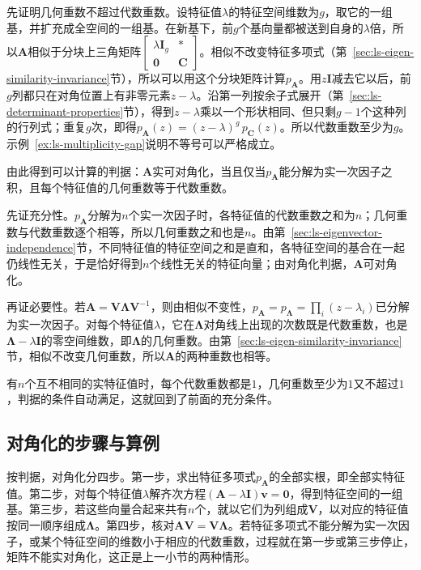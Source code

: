 先证明几何重数不超过代数重数。设特征值$\lambda$的特征空间维数为$g$，取它的一组基，并扩充成全空间的一组基。在新基下，前$g$个基向量都被送到自身的$\lambda$倍，所以$\bm A$相似于分块上三角矩阵$\left[\begin{smallmatrix}\lambda\bm I_g&*\\\bm0&\bm C\end{smallmatrix}\right]$。相似不改变特征多项式（第~\ref{sec:ls-eigen-similarity-invariance}节），所以可以用这个分块矩阵计算$p_{\bm A}$。用$z\bm I$减去它以后，前$g$列都只在对角位置上有非零元素$z-\lambda$。沿第一列按余子式展开（第~\ref{sec:ls-determinant-properties}节），得到$z-\lambda$乘以一个形状相同、但只剩$g-1$个这种列的行列式；重复$g$次，即得$p_{\bm A}(z)=(z-\lambda)^g\,p_{\bm C}(z)$。所以代数重数至少为$g$。示例~\ref{ex:ls-multiplicity-gap}说明不等号可以严格成立。

由此得到可以计算的判据：$\bm A$实可对角化，当且仅当$p_{\bm A}$能分解为实一次因子之积，且每个特征值的几何重数等于代数重数。

先证充分性。$p_{\bm A}$分解为$n$个实一次因子时，各特征值的代数重数之和为$n$；几何重数与代数重数逐个相等，所以几何重数之和也是$n$。由第~\ref{sec:ls-eigenvector-independence}节，不同特征值的特征空间之和是直和，各特征空间的基合在一起仍线性无关，于是恰好得到$n$个线性无关的特征向量；由对角化判据，$\bm A$可对角化。

再证必要性。若$\bm A=\bm V\bm\Lambda\bm V^{-1}$，则由相似不变性，$p_{\bm A}=p_{\bm\Lambda}=\prod_i(z-\lambda_i)$已分解为实一次因子。对每个特征值$\lambda$，它在$\bm\Lambda$对角线上出现的次数既是代数重数，也是$\bm\Lambda-\lambda\bm I$的零空间维数，即$\bm\Lambda$的几何重数。由第~\ref{sec:ls-eigen-similarity-invariance}节，相似不改变几何重数，所以$\bm A$的两种重数也相等。

有$n$个互不相同的实特征值时，每个代数重数都是$1$，几何重数至少为$1$又不超过$1$，判据的条件自动满足，这就回到了前面的充分条件。

\subsection{对角化的步骤与算例}

按判据，对角化分四步。第一步，求出特征多项式$p_{\bm A}$的全部实根，即全部实特征值。第二步，对每个特征值$\lambda$解齐次方程$(\bm A-\lambda\bm I)\bm v=\bm0$，得到特征空间的一组基。第三步，若这些向量合起来共有$n$个，就以它们为列组成$\bm V$，以对应的特征值按同一顺序组成$\bm\Lambda$。第四步，核对$\bm A\bm V=\bm V\bm\Lambda$。若特征多项式不能分解为实一次因子，或某个特征空间的维数小于相应的代数重数，过程就在第一步或第三步停止，矩阵不能实对角化，这正是上一小节的两种情形。

